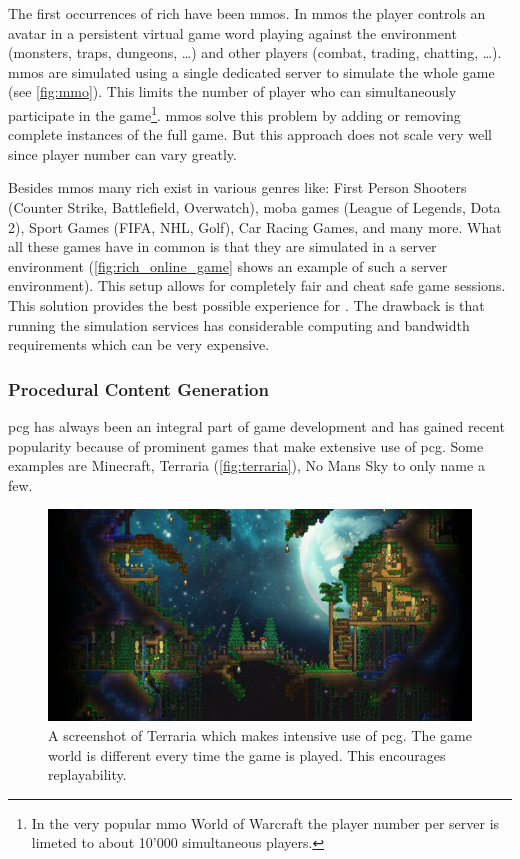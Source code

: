The first occurrences of rich \og{} have been \glspl{mmo}. In \glspl{mmo} the
player controls an avatar in a persistent virtual game word playing against the
environment (monsters, traps, dungeons, \ldots) and other players (combat,
trading, chatting, \ldots). \glspl{mmo} are simulated using a single dedicated
server to simulate the whole game (see \autoref{fig:mmo}). This limits the
number of player who can simultaneously participate in the game\footnote{In the
very popular \gls{mmo} World of Warcraft the player number per server is
limeted to about 10'000 simultaneous players.}. \glspl{mmo} solve this problem
by adding or removing complete instances of the full game. But this approach
does not scale very well since player number can vary greatly.

Besides \glspl{mmo} many rich \ogs{} exist in various genres like: First Person
Shooters (Counter Strike, Battlefield, Overwatch), \gls{moba} games (League of
Legends, Dota 2), Sport Games (FIFA, NHL, Golf), Car Racing Games, and many
more. What all these games have in common is that they are simulated in a server
environment (\autoref{fig:rich_online_game} shows an example of such a server
environment). This setup allows for completely fair and cheat safe game
sessions. This solution provides the best possible experience for \ogs{}. The
drawback is that running the simulation services has considerable computing and
bandwidth requirements which can be very expensive.

\subsubsection{Procedural Content Generation}

\gls{pcg} has always been an integral part of game
development and has gained recent popularity because of prominent games that
make extensive use of \gls{pcg}. Some examples are Minecraft, Terraria
(\autoref{fig:terraria}), No Mans Sky to only name a few.

\begin{figure}
	\centering
	\includegraphics[width=\textwidth]{images/terraria}
	\caption{A screenshot of Terraria which makes intensive use of \gls{pcg}. The game
	world is different every time the game is played. This encourages
	replayability.}
	\label{fig:terraria}
\end{figure}


